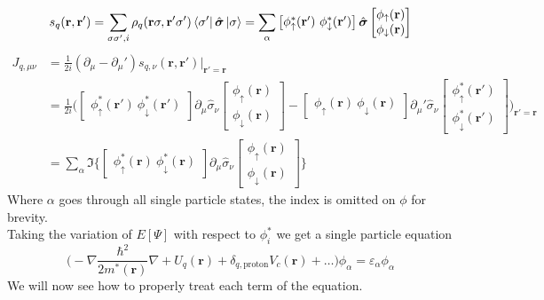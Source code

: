 \begin{equation}
    s_q(\mathbf r, \mathbf r') =\sum_{\sigma \sigma', i} \rho_q(\mathbf r \sigma, \mathbf r' \sigma')\bra{\sigma'} \hat {\boldsymbol{\sigma}} \ket{\sigma} = \sum_{\alpha} \begin{bmatrix} \phi_{\uparrow}^*(\mathbf r') \ \phi_{\downarrow}^*(\mathbf r') \end{bmatrix}\hat{\boldsymbol{\sigma}} \begin{bmatrix} \phi_{\uparrow}(\mathbf r) \\ \phi_{\downarrow}(\mathbf r) \end{bmatrix}
\end{equation}
\begin{align}
    J_{q, \mu\nu} &= \frac 1 {2i}(\partial_\mu - \partial_\mu') s_{q, \nu}(\mathbf r, \mathbf r')\bigg|_{\mathbf r'=\mathbf r}\\
    &= \frac 1 {2i}\bigg(\begin{bmatrix}\phi_{\uparrow}^*(\boldsymbol r')\ \phi_{\downarrow}^*(\boldsymbol r')\end{bmatrix} \partial_\mu\hat{\sigma}_\nu\begin{bmatrix} \phi_{\uparrow}(\mathbf r) \\ \phi_{\downarrow}(\mathbf r) \end{bmatrix} - \begin{bmatrix}\phi_{\uparrow}(\boldsymbol{r})\ \phi_{\downarrow}(\boldsymbol{r})\end{bmatrix} \partial_\mu'\hat{\sigma}_\nu\begin{bmatrix} \phi_{\uparrow}^*(\mathbf r') \\ \phi_{\downarrow}^*(\mathbf r') \end{bmatrix}\bigg)_{\mathbf r'=\mathbf r}
     \\&= \sum_\alpha\Im\bigg\{\begin{bmatrix}\phi_{\uparrow}^*(\boldsymbol r)\ \phi_{\downarrow}^*(\boldsymbol r) \end{bmatrix}\partial_\mu \hat{\sigma}_\nu\begin{bmatrix} \phi_{\uparrow}(\mathbf r) \\ \phi_{\downarrow}(\mathbf r) \end{bmatrix}\bigg\}
\end{align}
Where $\alpha$ goes through all single particle states, the index is omitted on $\phi$ for brevity.
\\Taking the variation of $E[\Psi]$ with respect to $\phi_i^*$ we get a single particle equation
\begin{equation}
   \bigg(-\nabla \frac{\hbar^2}{2m^*(\mathbf r)} \nabla + U_q(\mathbf r)+\delta_{q, \text{proton}}V_c(\mathbf r)+\ldots\bigg)\phi_\alpha = \varepsilon_\alpha\phi_\alpha 
\end{equation}
We will now see how to properly treat each term of the equation.

